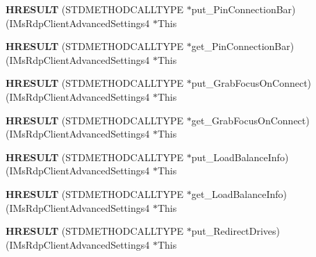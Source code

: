 \begin{DoxyCompactItemize}
{\bfseries H\+R\+E\+S\+U\+LT} (S\+T\+D\+M\+E\+T\+H\+O\+D\+C\+A\+L\+L\+T\+Y\+PE $\ast$put\+\_\+\+Pin\+Connection\+Bar)(I\+Ms\+Rdp\+Client\+Advanced\+Settings4 $\ast$This
\item 
\mbox{\label{struct_i_ms_rdp_client_advanced_settings4_vtbl_a145fc0f09b9ed5a815e6a5ec3a9c7b2e}} 
{\bfseries H\+R\+E\+S\+U\+LT} (S\+T\+D\+M\+E\+T\+H\+O\+D\+C\+A\+L\+L\+T\+Y\+PE $\ast$get\+\_\+\+Pin\+Connection\+Bar)(I\+Ms\+Rdp\+Client\+Advanced\+Settings4 $\ast$This
\item 
\mbox{\label{struct_i_ms_rdp_client_advanced_settings4_vtbl_a3424d1718563a2d45b4a468d912c0de5}} 
{\bfseries H\+R\+E\+S\+U\+LT} (S\+T\+D\+M\+E\+T\+H\+O\+D\+C\+A\+L\+L\+T\+Y\+PE $\ast$put\+\_\+\+Grab\+Focus\+On\+Connect)(I\+Ms\+Rdp\+Client\+Advanced\+Settings4 $\ast$This
\item 
\mbox{\label{struct_i_ms_rdp_client_advanced_settings4_vtbl_a4173298deecb7a0cf84dace6ea488ffa}} 
{\bfseries H\+R\+E\+S\+U\+LT} (S\+T\+D\+M\+E\+T\+H\+O\+D\+C\+A\+L\+L\+T\+Y\+PE $\ast$get\+\_\+\+Grab\+Focus\+On\+Connect)(I\+Ms\+Rdp\+Client\+Advanced\+Settings4 $\ast$This
\item 
\mbox{\label{struct_i_ms_rdp_client_advanced_settings4_vtbl_aea3790625419bc3ed3a4c10bb93dd471}} 
{\bfseries H\+R\+E\+S\+U\+LT} (S\+T\+D\+M\+E\+T\+H\+O\+D\+C\+A\+L\+L\+T\+Y\+PE $\ast$put\+\_\+\+Load\+Balance\+Info)(I\+Ms\+Rdp\+Client\+Advanced\+Settings4 $\ast$This
\item 
\mbox{\label{struct_i_ms_rdp_client_advanced_settings4_vtbl_aca7b740795764058631da2731fe28bd1}} 
{\bfseries H\+R\+E\+S\+U\+LT} (S\+T\+D\+M\+E\+T\+H\+O\+D\+C\+A\+L\+L\+T\+Y\+PE $\ast$get\+\_\+\+Load\+Balance\+Info)(I\+Ms\+Rdp\+Client\+Advanced\+Settings4 $\ast$This
\item 
\mbox{\label{struct_i_ms_rdp_client_advanced_settings4_vtbl_a665a1315d2eee4d3fba6383359acadfb}} 
{\bfseries H\+R\+E\+S\+U\+LT} (S\+T\+D\+M\+E\+T\+H\+O\+D\+C\+A\+L\+L\+T\+Y\+PE $\ast$put\+\_\+\+Redirect\+Drives)(I\+Ms\+Rdp\+Client\+Advanced\+Settings4 $\ast$This

\end{DoxyCompactItemize}

